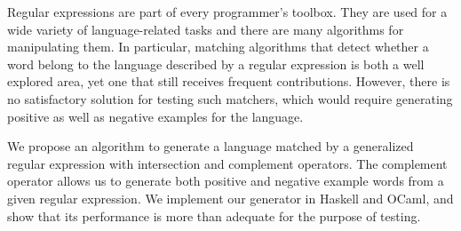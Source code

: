 Regular expressions are part of every programmer's toolbox.  They are
used for a wide variety of language-related tasks and there are many algorithms for
manipulating them. In particular, matching algorithms that detect
whether a word belong to the language described by a regular
expression is both a well explored area, 
yet one that still receives frequent contributions. However, there is
no satisfactory solution for testing such matchers, which would
require generating positive as well as negative examples for the language. 

We propose an algorithm to generate a language matched by a generalized
regular expression with intersection and complement operators.
The complement operator allows us to generate both positive and
negative example words
from a given regular expression.
We implement our generator in Haskell and OCaml,
and show that its performance is more than
adequate for the purpose of testing.

